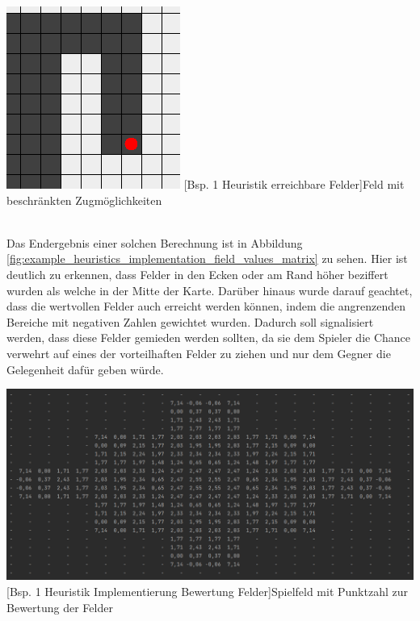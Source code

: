 \documentclass[12pt,a4paper,bibliography=totocnumbered,listof=totocnumbered]{article}
\begin{document}
\vspace{1em}
\begin{minipage}{\linewidth}
	\centering
	\includegraphics[width=0.5\linewidth]{pics/heuristics_reachable_fields.png}
	[Bsp. 1 Heuristik erreichbare Felder]{Feld mit beschränkten Zugmöglichkeiten}
	\label{fig:example_heuristics_reachable_fields}
\end{minipage}
\\

Das Endergebnis einer solchen Berechnung ist in Abbildung \ref{fig:example_heuristics_implementation_field_values_matrix} zu sehen. Hier ist deutlich zu erkennen, dass Felder in den Ecken oder am Rand höher beziffert wurden als welche in der Mitte der Karte. Darüber hinaus wurde darauf geachtet, dass die wertvollen Felder auch erreicht werden können, indem die angrenzenden Bereiche mit negativen Zahlen gewichtet wurden. Dadurch soll signalisiert werden, dass diese Felder gemieden werden sollten, da sie dem Spieler die Chance verwehrt auf eines der vorteilhaften Felder zu ziehen und nur dem Gegner die Gelegenheit dafür geben würde. 

\vspace{1em}
\begin{minipage}{\linewidth}
	\centering
	\includegraphics[width=0.8\linewidth]{pics/heuristics_implementation_field_values_matrix.png}
	[Bsp. 1 Heuristik Implementierung Bewertung Felder]{Spielfeld mit Punktzahl zur Bewertung der Felder}
	\label{fig:example_heuristics_implementation_field_values_matrix}
\end{minipage} 
\\
\end{document}
